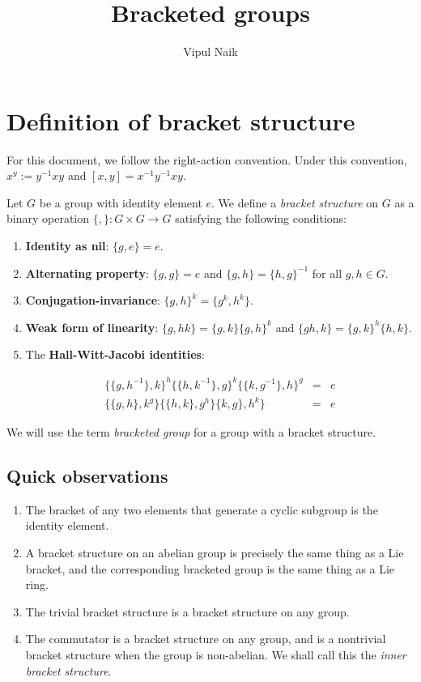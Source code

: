 \documentclass[10pt]{amsart}
\title{Bracketed groups}
\author{Vipul Naik}
\begin{document}
\maketitle

\begin{abstract}

\end{abstract}

\section{Definition of bracket structure}

For this document, we follow the right-action convention. Under this
convention, $x^y := y^{-1}xy$ and $[x,y] = x^{-1}y^{-1}xy$.

Let $G$ be a group with identity element $e$. We define a {\em bracket
structure} on $G$ as a binary operation $\{ , \}:G \times G \to G$
satisfying the following conditions:

\begin{enumerate}
\item {\bf Identity as nil}: $\{ g,e \} = e$.
\item {\bf Alternating property}: $\{ g,g \} = e$ and $\{ g,h \} = \{
  h,g \}^{-1}$ for all $g,h \in G$.
\item {\bf Conjugation-invariance}: $\{g,h \}^k = \{ g^k,h^k \}$.
\item {\bf Weak form of linearity}: $\{g,hk \} = \{ g,k \} \{ g,h\}^k$
  and $\{ gh,k \} = \{ g,k \}^h \{ h,k \}$.
\item The {\bf Hall-Witt-Jacobi identities}:
 
  \begin{eqnarray*}
    \{ \{g,h^{-1}\},k\}^h \{ \{h,k^{-1} \},g \}^k \{ \{k,g^{-1} \}, h \}^g & = & e\\
    \{ \{g,h \}, k^g \} \{ \{ h,k \}, g^h \} \{k,g \}, h^k \} & = & e
  \end{eqnarray*}
\end{enumerate}

We will use the term {\em bracketed group} for a group with a bracket structure.

\subsection{Quick observations}

\begin{enumerate}
\item The bracket of any two elements that generate a cyclic subgroup
  is the identity element.
\item A bracket structure on an abelian group is precisely the same
  thing as a Lie bracket, and the corresponding bracketed group is the
  same thing as a Lie ring.
\item The trivial bracket structure is a bracket structure on any
  group.
\item The commutator is a bracket structure on any group, and is a
  nontrivial bracket structure when the group is non-abelian. We shall
  call this the {\em inner bracket structure}.
\end{enumerate}
\end{document}
